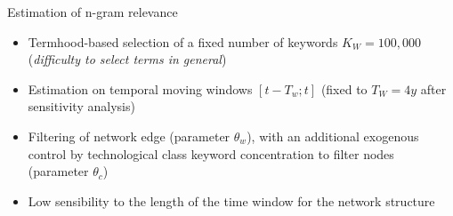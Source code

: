 \documentclass{beamer}
\begin{document}
\begin{frame}{Estimation of n-gram relevance}\label{slide:relevance}
    
    \begin{itemize}
        \item Termhood-based selection of a fixed number of keywords $K_W = 100,000$ (\textit{difficulty to select terms in general}) \hyperlink{slide:filtration}{}
        \item Estimation on temporal moving windows $\left[t - T_w ; t\right]$ (fixed to $T_W = 4y$ after sensitivity analysis)
        \item Filtering of network edge (parameter $\theta_w$), with an additional exogenous control by technological class keyword concentration to filter nodes (parameter $\theta_c$)
        \item Low sensibility to the length of the time window for the network structure  
\hyperlink{slide:sensitivity}{}
    \end{itemize}
    
\end{frame}
\end{document}

